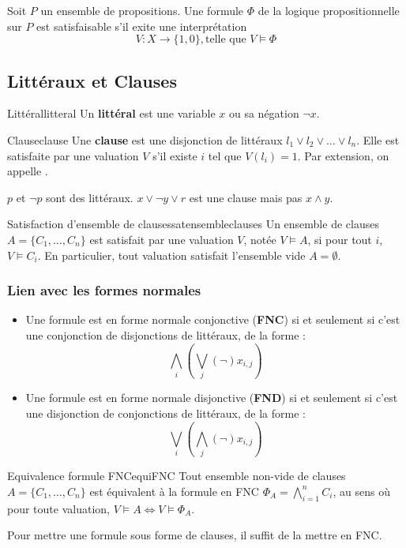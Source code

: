 \begin{remark}
    Soit $P$ un ensemble de propositions. Une formule $\Phi$ de la logique propositionnelle sur $P$ est satisfaisable s'il exite une interprétation
    \begin{equation*}
        V : X \rightarrow \{1, 0\}, \text{telle que } V \models \Phi
    \end{equation*}
\end{remark}
\subsection{Littéraux et Clauses}
\begin{definition}{Littéral}{litteral}
    Un \textbf{littéral} est une variable $x$ ou sa négation $\neg x$.
\end{definition}
\begin{definition}{Clause}{clause}
    Une \textbf{clause} est une disjonction de littéraux $l_1 \vee l_2 \vee \dots \vee l_n$. Elle est satisfaite par une valuation $V$ s'il existe $i$ tel que $V(l_i) = 1$. Par extension, on appelle .
\end{definition}
\begin{example}
    $p$ et $\neg p$ sont des littéraux. $x \vee\neg y \vee r$ est une clause mais pas $x \wedge y$.
\end{example}
\begin{theorem}{Satisfaction d'ensemble de clauses}{satensembleclauses}
    Un ensemble de clauses $A = \{C_1, \dots, C_n\}$ est satisfait par une valuation $V$, notée $V \models A$, si pour tout $i$, $V \models C_i$. En particulier, tout valuation satisfait l'ensemble vide $A = \emptyset$.
\end{theorem}
\subsubsection{Lien avec les formes normales}
\begin{itemize}[label=\textbullet]
    \item Une formule est en forme normale conjonctive (\textbf{FNC}) si et seulement si c'est une conjonction de disjonctions de littéraux, de la forme :
    \begin{equation*}
        \bigwedge_i(\bigvee_j(\neg)x_{i,j})
    \end{equation*}
    \item Une formule est en forme normale disjonctive (\textbf{FND}) si et seulement si c'est une disjonction de conjonctions de littéraux, de la forme :
    \begin{equation*}
        \bigvee_i(\bigwedge_j(\neg)x_{i,j})
    \end{equation*}
\end{itemize}
\begin{lemma}{Equivalence formule FNC}{equiFNC}
    Tout ensemble non-vide de clauses $A = \{C_1,\dots,C_n\}$ est équivalent à la formule en FNC $\Phi_A = \bigwedge_{i=1}^{n} C_i$, au sens où pour toute valuation, $V \models A \Leftrightarrow V \models \Phi_A$.
\end{lemma}
\begin{remark}
    Pour mettre une formule sous forme de clauses, il suffit de la mettre en FNC.
\end{remark}
